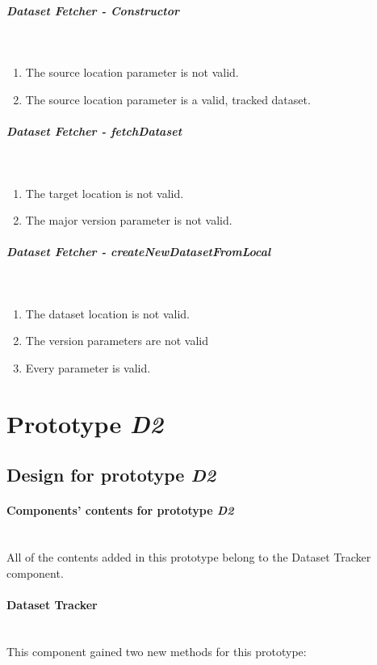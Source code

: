 \subparagraph{Dataset Fetcher - Constructor} \mbox{}\\
\begin{enumerate}
    \item The source location parameter is not valid.
    \item The source location parameter is a valid, tracked dataset.
\end{enumerate}

\subparagraph{Dataset Fetcher - fetchDataset} \mbox{}\\
\begin{enumerate}
    \item The target location is not valid.
    \item The major version parameter is not valid.
\end{enumerate}

\subparagraph{Dataset Fetcher - createNewDatasetFromLocal} \mbox{}\\
\begin{enumerate}
    \item The dataset location is not valid.
    \item The version parameters are not valid
    \item Every parameter is valid.
\end{enumerate}

\section {Prototype \emph{D2}}

\subsection{Design for prototype \emph{D2}}

\paragraph{Components' contents for prototype \emph{D2}} \mbox{}\\

All of the contents added in this prototype belong to the Dataset Tracker component.

\paragraph{Dataset Tracker} \mbox{}\\

This component gained two new methods for this prototype:

